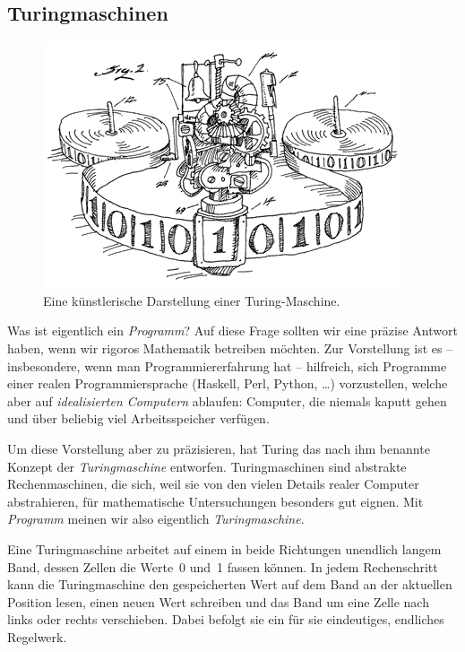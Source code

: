 \documentclass[twoside]{../zirkelblatt1415}
\theoremstyle{definition}
\theoremstyle{plain}
\theoremstyle{remark}
\begin{document}
\newpage
\subsection{Turingmaschinen}

\setlength{\wrapoverhang}{1cm}
\setlength{\columnsep}{0.5cm}
\begin{figure}
  \vspace{-3em}
  \includegraphics[scale=0.3]{turing-machine}
  \scriptsize
  Eine künstlerische Darstellung einer
  Turing-Maschine.\footnotemark
\end{figure}

Was ist eigentlich ein \emph{Programm}? Auf diese Frage sollten wir eine
präzise Antwort haben, wenn wir rigoros Mathematik betreiben möchten. Zur
Vorstellung ist es -- insbesondere, wenn man Programmiererfahrung hat --
hilfreich, sich Programme einer realen Programmiersprache (Haskell, Perl,
Python, \ldots) vorzustellen, welche aber auf \emph{idealisierten Computern}
ablaufen: Computer, die niemals kaputt gehen und über beliebig viel
Arbeitsspeicher verfügen.

Um diese Vorstellung aber zu präzisieren, hat Turing das nach ihm benannte
Konzept der \emph{Turingmaschine} entworfen. Turingmaschinen sind abstrakte
Rechenmaschinen, die sich, weil sie von den vielen Details realer Computer
abstrahieren, für mathematische Untersuchungen besonders gut eignen. Mit
\emph{Programm} meinen wir also eigentlich \emph{Turingmaschine}.

Eine Turingmaschine arbeitet auf einem in beide Richtungen unendlich langem
Band, dessen Zellen die Werte~0 und~1 fassen können.
In jedem Rechenschritt kann die
Turingmaschine den gespeicherten Wert auf dem Band an der aktuellen Position
lesen, einen neuen Wert schreiben und das Band um eine Zelle nach links oder
rechts verschieben. Dabei befolgt sie ein für sie eindeutiges, endliches
Regelwerk.
\end{document}

